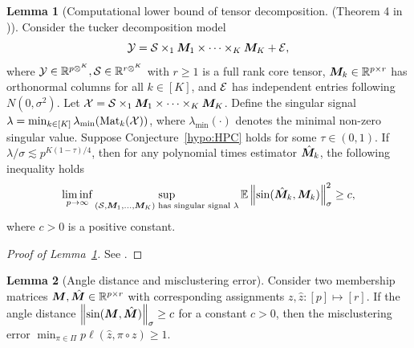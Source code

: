 \documentclass[lettersize,onecolumn,journal]{IEEEtran}
\theoremstyle{definition}
\newtheorem{lem}{Lemma}
\theoremstyle{definition}
\newcommand{\Mat}{\text{Mat}}
\def\fixme#1#2{\textbf{\color{red}[FIXME (#1): #2]}}
\begin{document}
\begin{lem}[Computational lower bound of tensor decomposition. (Theorem 4 in \cite{zhang2018tensor})]\label{lem:hpc} Consider the tucker decomposition model 
\begin{equation}
    \mathcal{Y} = \mathcal{S} \times_1 \bm M_1 \times \cdots \times_K \bm M_K + \mathcal{E},
\end{equation}
where $\mathcal{Y} \in \mathbb{R}^{p\otimes^K }, \mathcal{S} \in \mathbb{R}^{r \otimes^K}$ with $r \geq 1$ is a full rank core tensor, $\bm M_k \in \mathbb{R}^{p \times r}$ has orthonormal columns for all $k \in [K]$, and $\mathcal{E}$ has independent entries following $N(0,\sigma^2)$. Let $\mathcal{X} = \mathcal{S} \times_1 \bm M_1 \times \cdots \times_K \bm M_K $. Define the singular signal $\lambda = \min_{k \in [K]}\lambda_{\min} (\Mat_k(\tX))$, where $\lambda_{\min}(\cdot)$ denotes the minimal non-zero singular value. Suppose Conjecture~\ref{hypo:HPC} holds for some $\tau \in (0,1)$. If $\lambda /\sigma \lesssim p^{K(1- \tau)/4}$, then for any polynomial times estimator $\hat {\bm M}_k$, the following inequality holds
\begin{align}
    \liminf_{p \rightarrow \infty} \sup_{(\mathcal{S}, \bm M_1,...,\bm M_K) \text{ has singular signal }\lambda} \mathbb{E} \left\lVert \sin(\hat {\bm M}_k, \bm M_k) \right\rVert^2_{\sigma} \geq c,
\end{align}
where $c >0$ is a positive constant. 
\end{lem}

\begin{proof}[Proof of Lemma~\ref{lem:hpc}]
See \citet[Proof of Theorem 4]{zhang2018tensor}.
\end{proof}


\begin{lem}[Angle distance and misclustering error]\label{lem:angle_mcr} Consider two membership matrices $\bm M, \hat {\bm M} \in \mathbb{R}^{p \times r}$ with corresponding assignments $z, \hat z: [p] \mapsto [r]$. If the angle distance $\left\lVert\sin (\bm M, \hat {\bm M})\right\rVert_{\sigma} \geq c$ for a constant $c >0$, then the misclustering error $\min_{\pi \in \Pi}p\ell(\hat z,\pi \circ z )\geq 1$.
\end{lem}
\end{document}
